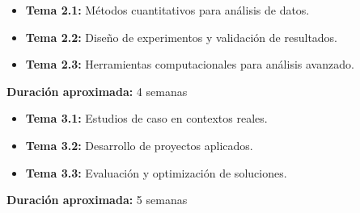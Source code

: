 \documentclass[12pt,a4paper]{article}
\begin{document}
\begin{tcolorbox}[colback=white,colframe=pucpAzul,title=\textbf{UNIDAD 2: Metodologías de Análisis}]
\begin{itemize}[leftmargin=*]
    \item \textbf{Tema 2.1:} Métodos cuantitativos para análisis de datos.
    \item \textbf{Tema 2.2:} Diseño de experimentos y validación de resultados.
    \item \textbf{Tema 2.3:} Herramientas computacionales para análisis avanzado.
\end{itemize}
\textbf{Duración aproximada:} 4 semanas
\end{tcolorbox}

\begin{tcolorbox}[colback=white,colframe=pucpAzul,title=\textbf{UNIDAD 3: Aplicaciones Prácticas}]
\begin{itemize}[leftmargin=*]
    \item \textbf{Tema 3.1:} Estudios de caso en contextos reales.
    \item \textbf{Tema 3.2:} Desarrollo de proyectos aplicados.
    \item \textbf{Tema 3.3:} Evaluación y optimización de soluciones.
\end{itemize}
\textbf{Duración aproximada:} 5 semanas
\end{tcolorbox}

\end{document}
